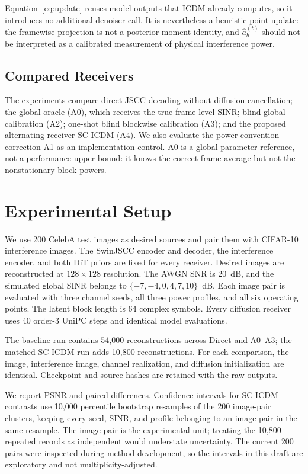 \documentclass[conference]{IEEEtran}
\newcommand{\method}{SC-ICDM}
\begin{document}
Equation~\eqref{eq:update} reuses model outputs that ICDM already computes, so
it introduces no additional denoiser call. It is nevertheless a heuristic
point update: the framewise projection is not a posterior-moment identity,
and $\widehat{a}_b^{(t)}$ should not be interpreted as a calibrated
measurement of physical interference power.

\subsection{Compared Receivers}

The experiments compare direct JSCC decoding without diffusion cancellation;
the global oracle (A0), which receives the true frame-level SINR; blind global
calibration (A2); one-shot blind blockwise calibration (A3); and the proposed
alternating receiver \method{} (A4). We also evaluate the power-convention
correction A1 as an implementation control. A0 is a global-parameter
reference, not a performance upper bound: it knows the correct frame average
but not the nonstationary block powers.

\section{Experimental Setup}

We use 200 CelebA test images as desired sources and pair them with CIFAR-10
interference images. The SwinJSCC encoder and decoder, the interference
encoder, and both DiT priors are fixed for every receiver. Desired images are
reconstructed at $128\times128$ resolution. The AWGN SNR is 20~dB, and the
simulated global SINR belongs to $\{-7,-4,0,4,7,10\}$~dB. Each image pair is
evaluated with three channel seeds, all three power profiles, and all six
operating points. The latent block length is 64 complex symbols. Every
diffusion receiver uses 40 order-3 UniPC steps and identical model
evaluations.

The baseline run contains 54,000 reconstructions across Direct and A0--A3;
the matched \method{} run adds 10,800 reconstructions. For each comparison,
the image, interference image, channel realization, and diffusion
initialization are identical. Checkpoint and source hashes are retained with
the raw outputs.

We report PSNR and paired differences. Confidence intervals for \method{}
contrasts use 10,000 percentile bootstrap resamples of the 200 image-pair
clusters, keeping every seed, SINR, and profile belonging to an image pair in
the same resample. The image pair is the experimental unit; treating the
10,800 repeated records as independent would understate uncertainty. The
current 200 pairs were inspected during method development, so the intervals
in this draft are exploratory and not multiplicity-adjusted.
\end{document}
